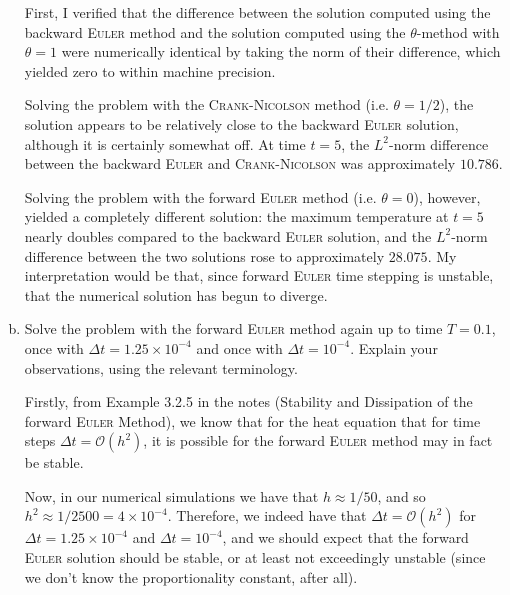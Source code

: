 \begin{enumerate}[(a)]
\vspace{0.5cm}
\begin{solution}

First, I verified that the difference between the solution computed using the backward \textsc{Euler} method and the solution computed using the $\theta$-method with $\theta = 1$ were numerically identical by taking the norm of their difference, which yielded zero to within machine precision.

Solving the problem with the \textsc{Crank-Nicolson} method (i.e. $\theta = 1/2$), the solution appears to be relatively close to the backward \textsc{Euler} solution, although it is certainly somewhat off.
At time $t=5$, the $L^2$-norm difference between the backward \textsc{Euler} and \textsc{Crank-Nicolson} was approximately $10.786$.

Solving the problem with the forward \textsc{Euler} method (i.e. $\theta = 0$), however, yielded a completely different solution: the maximum temperature at $t=5$ nearly doubles compared to the backward \textsc{Euler} solution, and the $L^2$-norm difference between the two solutions rose to approximately $28.075$.
My interpretation would be that, since forward \textsc{Euler} time stepping is unstable, that the numerical solution has begun to diverge.

\end{solution}

\newpage
\item%
Solve the problem with the forward \textsc{Euler} method again up to time $T=0.1$, once with $\Delta t = 1.25 \times 10^{-4}$ and once with $\Delta t = 10^{-4}$. Explain your observations, using the relevant terminology.

\vspace{0.5cm}
\begin{solution}

Firstly, from Example 3.2.5 in the notes (Stability and Dissipation of the forward \textsc{Euler} Method), we know that for the heat equation that for time steps $\Delta t = \mathcal{O}(h^2)$, it is possible for the forward \textsc{Euler} method may in fact be stable.

Now, in our numerical simulations we have that $h \approx 1/50$, and so $h^2 \approx 1/2500 = 4 \times 10^{-4}$.
Therefore, we indeed have that $\Delta t = \mathcal{O}(h^2)$ for $\Delta t = 1.25 \times 10^{-4}$ and $\Delta t = 10^{-4}$, and we should expect that the forward \textsc{Euler} solution should be stable, or at least not exceedingly unstable (since we don't know the proportionality constant, after all).


\end{solution}
\end{enumerate}
